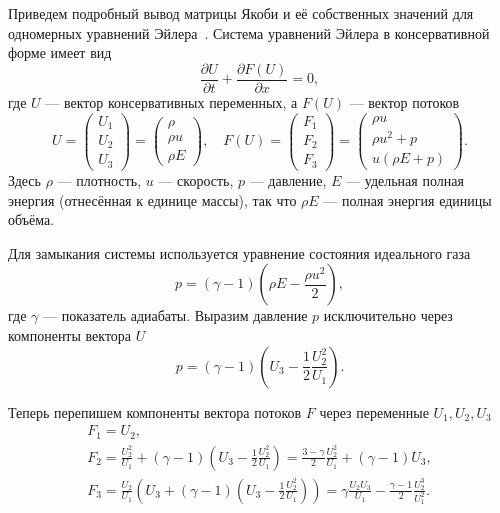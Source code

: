 \documentclass[a4paper,14pt]{extarticle}
\theoremstyle{theorem}
\theoremstyle{lemma}
\begin{document}
Приведем подробный вывод матрицы Якоби и её собственных значений для одномерных уравнений Эйлера~\cite{toro}. Система уравнений Эйлера в консервативной форме имеет вид
\begin{equation}
    \label{eq:euler_1d}
    \frac{\partial U}{\partial t} + \frac{\partial F(U)}{\partial x} = 0,
\end{equation}
где $U$ --- вектор консервативных переменных, а $F(U)$ --- вектор потоков
\begin{equation}
    U = \begin{pmatrix} U_1 \\ U_2 \\ U_3 \end{pmatrix} = \begin{pmatrix} \rho \\ \rho u \\ \rho E \end{pmatrix}, \quad
    F(U) = \begin{pmatrix} F_1 \\ F_2 \\ F_3 \end{pmatrix} = \begin{pmatrix} \rho u \\ \rho u^2 + p \\ u( \rho E + p) \end{pmatrix}.
\end{equation}
Здесь $\rho$ --- плотность, $u$ --- скорость, $p$ --- давление, $E$ --- удельная полная энергия (отнесённая к единице массы), так что $\rho E$ --- полная энергия единицы объёма.

Для замыкания системы используется уравнение состояния идеального газа
\begin{equation}
    p = (\gamma - 1)\left( \rho E - \frac{\rho u^2}{2} \right),
\end{equation}
где $\gamma$ --- показатель адиабаты. Выразим давление $p$ исключительно через компоненты вектора $U$
\begin{equation}
    p = (\gamma - 1)\left( U_3 - \frac{1}{2}\frac{U_2^2}{U_1} \right).
\end{equation}

Теперь перепишем компоненты вектора потоков $F$ через переменные $U_1, U_2, U_3$
{\setlength{\abovedisplayskip}{2pt}
\setlength{\abovedisplayshortskip}{2pt}
\begin{gather}
    F_1 = U_2, \\
    F_2 = \frac{U_2^2}{U_1} + (\gamma - 1)\left( U_3 - \frac{1}{2}\frac{U_2^2}{U_1} \right) = \frac{3-\gamma}{2}\frac{U_2^2}{U_1} + (\gamma - 1)U_3, \\
    F_3 = \frac{U_2}{U_1}\left( U_3 + (\gamma - 1)\left( U_3 - \frac{1}{2}\frac{U_2^2}{U_1} \right) \right) = \gamma \frac{U_2 U_3}{U_1} - \frac{\gamma - 1}{2}\frac{U_2^3}{U_1^2}.
\end{gather}
}
\end{document}
